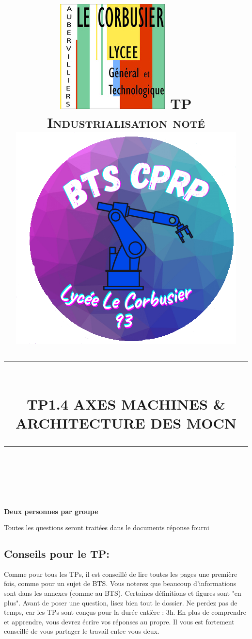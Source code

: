 \documentclass[12pt]{article}
\newcommand{\HRule}[1]{\rule{\linewidth}{#1}}
\begin{document}
 
\title{ \includegraphics[width=0.18\linewidth]{corbu.jpg} \hspace{2cm} \normalsize \textsc{TP Industrialisation noté \hspace{2cm} \includegraphics[width=0.2\linewidth]{btscprp.png}}
		\\ [2.0cm]
		\HRule{0.5pt} \\
		\LARGE \textbf{\uppercase{TP1.4 Axes Machines \& architecture des MOCN}}
		\HRule{2pt} \\ [0.5cm]}
\maketitle

\textbf{Deux personnes par groupe}\\
\begin{center}
Toutes les questions seront traitées dans le documents réponse fourni
\end{center}










\sectionfont{\scshape}




\newpage




\tableofcontents
\newpage



\subsection*{Conseils pour le TP:}
\begin{tcolorbox}[colback=blue!5!white,colframe=red!75!black]
  \bcinfo Comme pour tous les TPs, il est conseillé de lire toutes les pages une première fois, comme pour un sujet de BTS. Vous noterez que beaucoup d'informations sont dans les annexes (comme au BTS). Certaines définitions et figures sont "en plus". Avant de poser une question, lisez bien tout le dossier. Ne perdez pas de temps, car les TPs sont conçus pour la durée entière : 3h. En plus de comprendre et apprendre, vous devrez écrire vos réponses au propre. Il vous est fortement conseillé de vous partager le travail entre vous deux.
\end{tcolorbox}
\end{document}
